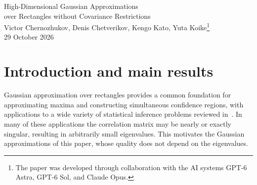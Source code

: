 \documentclass[11pt,letterpaper]{article}
\theoremstyle{remark}
\newcommand{\E}{\mathbb E}
\newcommand{\Pp}{\mathbb P}
\newcommand{\R}{\mathbb R}
\begin{document}
\begin{center}
{\Large High-Dimensional Gaussian Approximations\\[0.15em]
over Rectangles without Covariance Restrictions}\\[0.85em]
{\normalsize Victor Chernozhukov, Denis Chetverikov, Kengo Kato, Yuta
Koike\renewcommand{\thefootnote}{\fnsymbol{footnote}}\footnote{The paper
was developed through collaboration with the AI systems GPT-6 Astra,
GPT-6 Sol, and Claude Opus.}}\\[0.65em]
{\normalsize 29 October 2026}
\end{center}
\setcounter{footnote}{0}
\thispagestyle{plain}

\begin{abstract}
 This paper studies the Gaussian approximation of sums of independent bounded random
vectors over rectangles, with no assumption on the correlation matrix,
which may be singular. Let \(X_1,\ldots,X_n\) be independent centered
random vectors in \(\R^p\) whose coordinates \(X_{ij}\) are bounded in
absolute value by a constant~\(B\), and suppose that each coordinate of
\(W_n\coloneqq n^{-1/2}(X_1+\cdots+X_n)\) has unit variance. Let \(Z_n\) be a
centered Gaussian vector with the covariance matrix of \(W_n\), and put
\(L\coloneqq \log(ep)\) and \(\log_+x\coloneqq \max\{0,\log x\}\). The largest difference
between \(\Pp(W_n\in A)\) and \(\Pp(Z_n\in A)\) over rectangles \(A\) is
at most
\[
 \frac{BL^{3/2}}{\sqrt n}\sqrt{1+\log_+\sqrt{n/L}},
\]
up to a numerical constant. If, for a fixed \(c_0>0\), no two
coordinates have correlation larger than \(1-c_0\) in absolute value, the
bound improves slightly. When \(p\) grows
polynomially in~\(n\), the two bounds are of order \(n^{-1/2}(\log n)^2\) and
\(n^{-1/2}(\log n)^{3/2}\), respectively. A further refinement holds if the
third moments cancel in aggregate, that is, if
\(\sum_i\E[X_{ij}X_{ik}X_{i\ell}]=0\) for all coordinates \(j,k,\ell\).
The factor \(BL^{3/2}/\sqrt n\) cannot be improved in general, so the
second rate is then optimal and the first is optimal up to the factor
\((\log n)^{1/2}\).

\end{abstract}

\clearpage
\begingroup
\small
\linespread{0.96}\selectfont
\tableofcontents
\endgroup
\clearpage

\section{\texorpdfstring{Introduction and main results}{Introduction and main results}}\label{sec:results}
Gaussian approximation over rectangles provides a common foundation for
approximating maxima and constructing simultaneous confidence regions, with
applications to a wide variety of statistical inference problems reviewed in~\cite{CCKK2023}.
In many of these applications the correlation matrix may be nearly or
exactly singular, resulting in arbitrarily small eigenvalues. This motivates the
Gaussian approximations of this paper, whose quality does not depend on the
eigenvalues.
\end{document}
